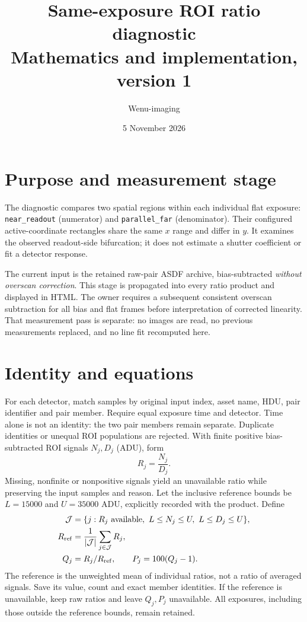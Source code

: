 \documentclass[11pt,a4paper]{article}
\title{Same-exposure ROI ratio diagnostic\\Mathematics and implementation, version 1}
\author{Wenu-imaging}
\date{5 November 2026}
\begin{document}
\maketitle
\section*{Purpose and measurement stage}
The diagnostic compares two spatial regions within each individual flat
exposure: \texttt{near\_readout} (numerator) and \texttt{parallel\_far}
(denominator). Their configured active-coordinate rectangles share the same
$x$ range and differ in $y$. It examines the observed readout-side bifurcation;
it does not estimate a shutter coefficient or fit a detector response.

The current input is the retained raw-pair ASDF archive, bias-subtracted
\emph{without overscan correction}. This stage is propagated into every ratio
product and displayed in HTML. The owner requires a subsequent consistent
overscan subtraction for all bias and flat frames before interpretation of
corrected linearity. That measurement pass is separate: no images are read,
no previous measurements replaced, and no line fit recomputed here.

\section*{Identity and equations}
For each detector, match samples by original input index, asset name, HDU,
pair identifier and pair member. Require equal exposure time and detector.
Time alone is not an identity: the two pair members remain separate. Duplicate
identities or unequal ROI populations are rejected. With finite positive
bias-subtracted ROI signals $N_j,D_j$ (ADU), form
\begin{equation}
R_j=\frac{N_j}{D_j}.
\end{equation}
Missing, nonfinite or nonpositive signals yield an unavailable ratio while
preserving the input samples and reason. Let the inclusive reference bounds be
$L=15000$ and $U=35000$ ADU, explicitly recorded with the product. Define
\begin{align}
\mathcal J&=\{j:R_j\text{ available},\ L\le N_j\le U,\ L\le D_j\le U\},\\
R_{\rm ref}&=\frac{1}{|\mathcal J|}\sum_{j\in\mathcal J}R_j,\\
Q_j&=R_j/R_{\rm ref},\qquad P_j=100(Q_j-1).
\end{align}
The reference is the unweighted mean of individual ratios, not a ratio of
averaged signals. Save its value, count and exact member identities. If the
reference is unavailable, keep raw ratios and leave $Q_j,P_j$ unavailable.
All exposures, including those outside the reference bounds, remain retained.
\end{document}
